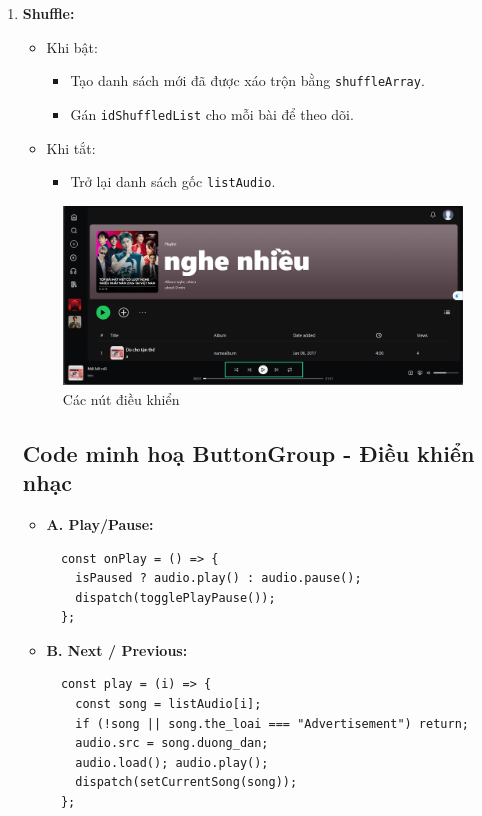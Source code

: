 \begin{enumerate}
  \item \textbf{Shuffle:}
  \begin{itemize}
    \item Khi bật:
    \begin{itemize}
      \item Tạo danh sách mới đã được xáo trộn bằng \texttt{shuffleArray}.
      \item Gán \texttt{idShuffledList} cho mỗi bài để theo dõi.
    \end{itemize}
    \item Khi tắt:
    \begin{itemize}
      \item Trở lại danh sách gốc \texttt{listAudio}.
    \end{itemize}
  \end{itemize}
  \begin{figure}[H]
    \centering
    \includegraphics[width=1\textwidth]{imgs/trienkhaife/btn-group.png} 
    \caption{Các nút điều khiển}
  \end{figure}
  \subsection*{Code minh hoạ ButtonGroup - Điều khiển nhạc}
  \begin{itemize}
    \item \textbf{A. Play/Pause:}
    \begin{verbatim}
  const onPlay = () => {
    isPaused ? audio.play() : audio.pause();
    dispatch(togglePlayPause());
  };
    \end{verbatim}
  
    \item \textbf{B. Next / Previous:}
    \begin{verbatim}
  const play = (i) => {
    const song = listAudio[i];
    if (!song || song.the_loai === "Advertisement") return;
    audio.src = song.duong_dan;
    audio.load(); audio.play();
    dispatch(setCurrentSong(song));
  };
    \end{verbatim}
  

\end{itemize}
\end{enumerate}
